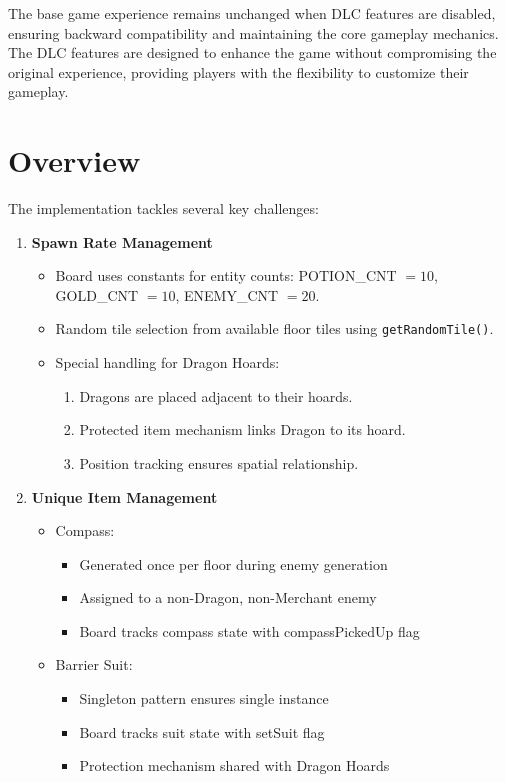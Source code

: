 \documentclass{article}
\begin{document}
The base game experience remains unchanged when DLC features are disabled, ensuring backward compatibility and maintaining the core gameplay mechanics. The DLC features are designed to enhance the game without compromising the original experience, providing players with the flexibility to customize their gameplay.

\section{Overview}
The implementation tackles several key challenges:

\begin{enumerate}
    \item \textbf{Spawn Rate Management}
    \begin{itemize}
        \item Board uses constants for entity counts: POTION\_CNT $= 10$, GOLD\_CNT $= 10$, ENEMY\_CNT $= 20$.
        \item Random tile selection from available floor tiles using \texttt{getRandomTile()}.
        \item Special handling for Dragon Hoards:
            \begin{enumerate}
                \item Dragons are placed adjacent to their hoards.
                \item Protected item mechanism links Dragon to its hoard.
                \item Position tracking ensures spatial relationship.
            \end{enumerate}
    \end{itemize}

    \item \textbf{Unique Item Management}
    \begin{itemize}
        \item Compass:
        \begin{itemize}
            \item Generated once per floor during enemy generation
            \item Assigned to a non-Dragon, non-Merchant enemy
            \item Board tracks compass state with compassPickedUp flag
        \end{itemize}
        \item Barrier Suit:
        \begin{itemize}
            \item Singleton pattern ensures single instance
            \item Board tracks suit state with setSuit flag
            \item Protection mechanism shared with Dragon Hoards
        \end{itemize}
    \end{itemize}


\end{enumerate}
\end{document}
